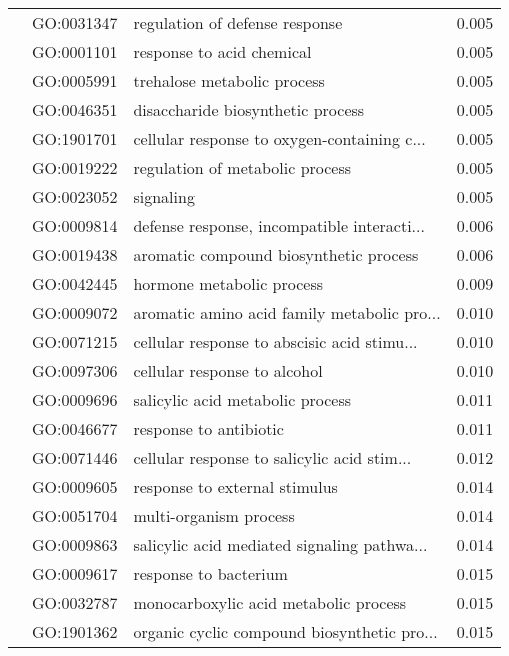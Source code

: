 \begin{longtable}{lllr}
   & GO:0031347 &               regulation of defense response &         0.005 \\
   & GO:0001101 &                    response to acid chemical &         0.005 \\
   & GO:0005991 &                  trehalose metabolic process &         0.005 \\
   & GO:0046351 &            disaccharide biosynthetic process &         0.005 \\
   & GO:1901701 &  cellular response to oxygen-containing c... &         0.005 \\
   & GO:0019222 &              regulation of metabolic process &         0.005 \\
   & GO:0023052 &                                    signaling &         0.005 \\
   & GO:0009814 &  defense response, incompatible interacti... &         0.006 \\
   & GO:0019438 &       aromatic compound biosynthetic process &         0.006 \\
   & GO:0042445 &                    hormone metabolic process &         0.009 \\
   & GO:0009072 &  aromatic amino acid family metabolic pro... &         0.010 \\
   & GO:0071215 &  cellular response to abscisic acid stimu... &         0.010 \\
   & GO:0097306 &                 cellular response to alcohol &         0.010 \\
   & GO:0009696 &             salicylic acid metabolic process &         0.011 \\
   & GO:0046677 &                       response to antibiotic &         0.011 \\
   & GO:0071446 &  cellular response to salicylic acid stim... &         0.012 \\
   & GO:0009605 &                response to external stimulus &         0.014 \\
   & GO:0051704 &                       multi-organism process &         0.014 \\
   & GO:0009863 &  salicylic acid mediated signaling pathwa... &         0.014 \\
   & GO:0009617 &                        response to bacterium &         0.015 \\
   & GO:0032787 &        monocarboxylic acid metabolic process &         0.015 \\
   & GO:1901362 &  organic cyclic compound biosynthetic pro... &         0.015 \\

\end{longtable}
